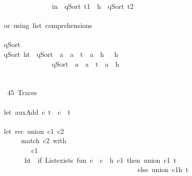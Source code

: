 \documentclass[a4paper]{article}
\begin{document}
\begin{tabbing}
\ttfamily ~~~~~~~~~~~~~~~in~~qSort~t1~~h~~qSort~t2\\
\ttfamily ~\\
\ttfamily ~or~using~list~comprehensions\\
\ttfamily ~\\
\ttfamily ~qSort~~~\\
\ttfamily ~qSort~ht~~qSort~~a~~a~~t~~a~~h~~~h~~\\
\ttfamily ~~~~~~~~~~~~~~~qSort~~a~~a~~t~~a~~h~\\
\ttfamily ~\\
\ttfamily ~\\
\ttfamily ~~45~Traces~\\
\ttfamily ~\\
\ttfamily ~let~auxAdd~c~t~~c~~t\\
\ttfamily ~\\
\ttfamily ~let~rec~union~c1~c2~~\\
\ttfamily ~~~~~~match~c2~with\\
\ttfamily ~~~~~~~~~c1\\
\ttfamily ~~~~~~~ht~~if~Listexists~fun~c~~c~~h~c1~then~union~c1~t\\
\ttfamily ~~~~~~~~~~~~~~~~~~~~~~~~~~~~~~~~~~~~~~~~else~union~c1h~t~\\
\ttfamily ~\\

\end{tabbing}
\end{document}
